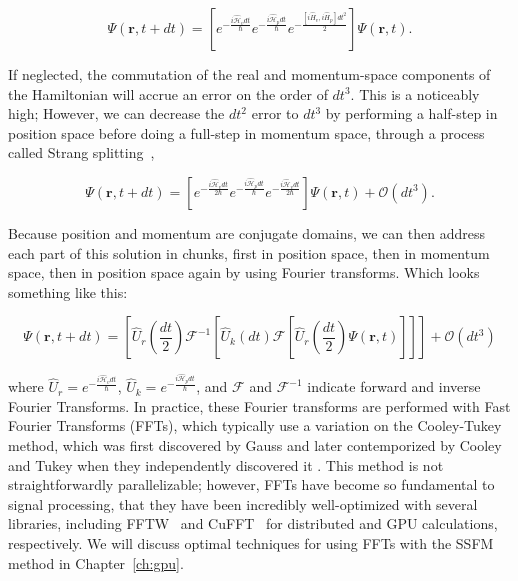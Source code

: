 \begin{equation}
\Psi(\mathbf{r},t+dt) = \left[e^{-\frac{i\mathcal{\hat{H}}_vdt}{\hbar}}e^{-\frac{i\mathcal{\hat{H}}_pdt}{\hbar}}e^{-\frac{[i\hat{H}_v, i\hat{H}_p]dt^2}{2}}\right]\Psi(\mathbf{r},t).
\label{eqn:rsolve}
\end{equation}

\noindent If neglected, the commutation of the real and momentum-space components of the Hamiltonian will accrue an error on the order of $dt^3$.
This is a noticeably high;
However, we can decrease the $dt^2$ error to $dt^3$ by performing a half-step in position space before doing a full-step in momentum space, through a process called Strang splitting~\cite{strang1968},

\begin{equation}
\Psi(\mathbf{r},t+dt) = \left[e^{-\frac{i\mathcal{\hat{H}}_vdt}{2\hbar}}e^{-\frac{i\mathcal{\hat{H}}_pdt}{\hbar}}e^{-\frac{i\mathcal{\hat{H}}_vdt}{2\hbar}} \right]\Psi(\mathbf{r},t) + \mathcal{O}(dt^3).
\end{equation}

\noindent Because position and momentum are conjugate domains, we can then address each part of this solution in chunks, first in position space, then in momentum space, then in position space again by using Fourier transforms.
Which looks something like this:

\begin{equation}
\Psi(\mathbf{r}, t+dt) = \left[\hat{U}_r\left(\frac{dt}{2}\right)\mathcal{F}^{-1}\left[\hat{U}_k(dt) \mathcal{F} \left[\hat{U}_r\left(\frac{dt}{2}\right) \Psi(\mathbf{r},t) \right] \right] \right] + \mathcal{O}(dt^3)
\end{equation}

\noindent where $\hat{U}_r = e^{-\frac{i\mathcal{\hat{H}}_vdt}{\hbar}}$, $\hat{U}_k = e^{-\frac{i\mathcal{\hat{H}}_pdt}{\hbar}}$, and $\mathcal{F}$ and $\mathcal{F}^{-1}$ indicate forward and inverse Fourier Transforms.
In practice, these Fourier transforms are performed with Fast Fourier Transforms (FFTs), which typically use a variation on the Cooley-Tukey method, which was first discovered by Gauss and later contemporized by Cooley and Tukey when they independently discovered it \cite{cooley1965}.
This method is not straightforwardly parallelizable; however, FFTs have become so fundamental to signal processing, that they have been incredibly well-optimized with several libraries, including FFTW~\cite{frigo1998} and CuFFT~\cite{fatica2008} for distributed and GPU calculations, respectively.
We will discuss optimal techniques for using FFTs with the SSFM method in Chapter~\ref{ch:gpu}.

